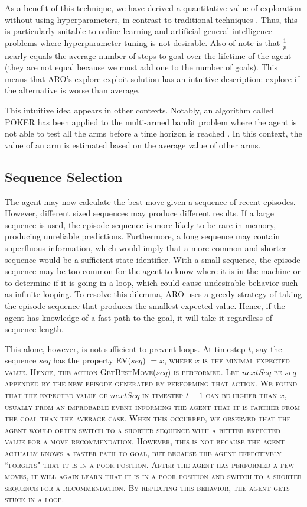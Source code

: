 \documentclass[letterpaper]{article} %
\begin{document}
As a benefit of this technique, we have derived a quantitative value
of exploration without using hyperparameters, in contrast to
traditional techniques \cite{Sutton98,Kearns02,Brafman02}. Thus, this
is particularly suitable to online learning and artificial general
intelligence problems where hyperparameter tuning is not
desirable. Also of note is that $\frac{1}{p}$ nearly equals the
average number of steps to goal over the lifetime of the agent (they
are not equal because we must add one to the number of goals). This
means that ARO's explore-exploit solution has an intuitive
description: explore if the alternative is worse than average.

This intuitive idea appears in other contexts.  Notably, an algorithm
called POKER has been applied to the multi-armed bandit problem where
the agent is not able to test all the arms before a time horizon is
reached \cite{Vermore05}.  In this context, the value of an arm is
estimated based on the average value of other arms.



\subsection{Sequence Selection}

The agent may now calculate the best move given a sequence of recent
episodes. However, different sized sequences may produce different
results. If a large sequence is used, the episode sequence is more
likely to be rare in memory, producing unreliable
predictions. Furthermore, a long sequence may contain superfluous
information, which would imply that a more common and shorter sequence
would be a sufficient state identifier. With a small sequence, the
episode sequence may be too common for the agent to know where it is
in the machine or to determine if it is going in a loop, which could
cause undesirable behavior such as infinite looping. To resolve this
dilemma, ARO uses a greedy strategy of taking the episode sequence
that produces the smallest expected value. Hence, if the agent has
knowledge of a fast path to the goal, it will take it regardless of
sequence length.

This alone, however, is not sufficient to prevent loops. At timestep
$t$, say the sequence $seq$ has the property \scshape
EV\normalfont($seq$) $ = x$, where $x$ is the minimal expected
value. Hence, the action \scshape GetBestMove\normalfont($seq$) is
performed. Let $nextSeq$ be $seq$ appended by the new episode
generated by performing that action. We found that the expected value
of $nextSeq$ in timestep $t+ 1$ can be higher than $x$, usually from
an improbable event informing the agent that it is farther from the
goal than the average case. When this occurred, we observed that the
agent would often switch to a shorter sequence with a better expected
value for a move recommendation. However, this is not because the
agent actually knows a faster path to goal, but because the agent
effectively ``forgets" that it is in a poor position. After the agent
has performed a few moves, it will again learn that it is in a poor
position and switch to a shorter sequence for a recommendation. By
repeating this behavior, the agent gets stuck in a loop.
\end{document}

